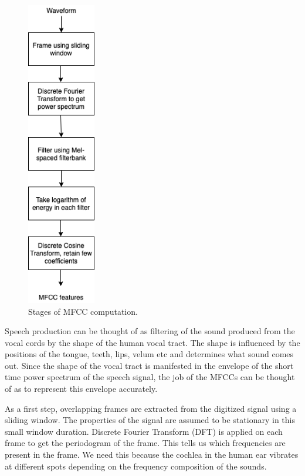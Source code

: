 \begin{figure}[h]
	\includegraphics[width=3cm]{figures/mfcc.png}
	\centering
	\caption{Stages of MFCC computation.}
	\label{fig:fig-mfcc}
\end{figure}

Speech production can be thought of as filtering of the sound produced from the vocal cords by the shape of the human vocal tract. The shape is influenced by the positions of the tongue, teeth, lips, velum etc and determines what sound comes out. Since the shape of the vocal tract is manifested in the envelope of the short time power spectrum of the speech signal, the job of the MFCCs can be thought of as to represent this envelope accurately.

As a first step, overlapping frames are extracted from the digitized signal using a sliding window. The properties of the signal are assumed to be stationary in this small window duration. Discrete Fourier Transform (DFT) is applied on each frame to get the periodogram of the frame. This tells us which frequencies are present in the frame. We need this because the cochlea in the human ear vibrates at different spots depending on the frequency composition of the sounds.

